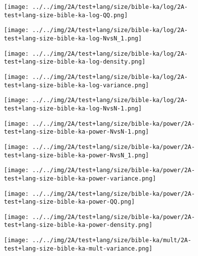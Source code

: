 \begin{figure}[H]
\centering	\texttt{[image: ../../img/2A/test+lang/size/bible-ka/log/2A-test+lang-size-bible-ka-log-QQ.png]}
\end{figure}
\begin{figure}[H]
\centering	\texttt{[image: ../../img/2A/test+lang/size/bible-ka/log/2A-test+lang-size-bible-ka-log-NvsN\_1.png]}
\end{figure}
\begin{figure}[H]
\centering	\texttt{[image: ../../img/2A/test+lang/size/bible-ka/log/2A-test+lang-size-bible-ka-log-density.png]}
\end{figure}
\begin{figure}[H]
\centering	\texttt{[image: ../../img/2A/test+lang/size/bible-ka/log/2A-test+lang-size-bible-ka-log-variance.png]}
\end{figure}
\begin{figure}[H]
\centering	\texttt{[image: ../../img/2A/test+lang/size/bible-ka/log/2A-test+lang-size-bible-ka-log-NvsN-1.png]}
\end{figure}
\begin{figure}[H]
\centering	\texttt{[image: ../../img/2A/test+lang/size/bible-ka/power/2A-test+lang-size-bible-ka-power-NvsN-1.png]}
\end{figure}
\begin{figure}[H]
\centering	\texttt{[image: ../../img/2A/test+lang/size/bible-ka/power/2A-test+lang-size-bible-ka-power-NvsN\_1.png]}
\end{figure}
\begin{figure}[H]
\centering	\texttt{[image: ../../img/2A/test+lang/size/bible-ka/power/2A-test+lang-size-bible-ka-power-variance.png]}
\end{figure}
\begin{figure}[H]
\centering	\texttt{[image: ../../img/2A/test+lang/size/bible-ka/power/2A-test+lang-size-bible-ka-power-QQ.png]}
\end{figure}
\begin{figure}[H]
\centering	\texttt{[image: ../../img/2A/test+lang/size/bible-ka/power/2A-test+lang-size-bible-ka-power-density.png]}
\end{figure}
\begin{figure}[H]
\centering	\texttt{[image: ../../img/2A/test+lang/size/bible-ka/mult/2A-test+lang-size-bible-ka-mult-variance.png]}
\end{figure}
